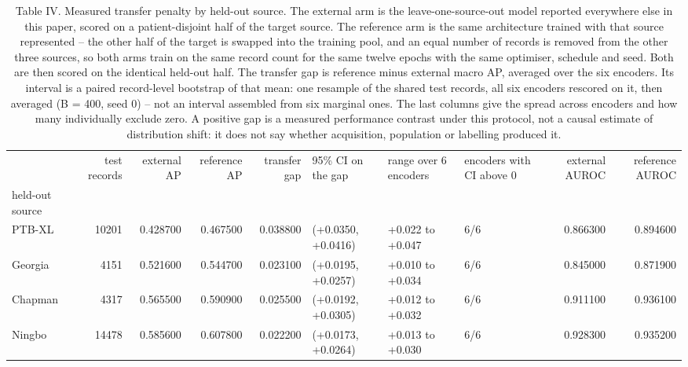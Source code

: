\begin{table}
\caption{Table IV. Measured transfer penalty by held-out source. The external arm is the leave-one-source-out model reported everywhere else in this paper, scored on a patient-disjoint half of the target source. The reference arm is the same architecture trained with that source represented -- the other half of the target is swapped into the training pool, and an equal number of records is removed from the other three sources, so both arms train on the same record count for the same twelve epochs with the same optimiser, schedule and seed. Both are then scored on the identical held-out half. The transfer gap is reference minus external macro AP, averaged over the six encoders. Its interval is a paired record-level bootstrap of that mean: one resample of the shared test records, all six encoders rescored on it, then averaged (B = 400, seed 0) -- not an interval assembled from six marginal ones. The last columns give the spread across encoders and how many individually exclude zero. A positive gap is a measured performance contrast under this protocol, not a causal estimate of distribution shift: it does not say whether acquisition, population or labelling produced it.}
\begin{tabular}{lrrrrlllrr}
\toprule
 & test records & external AP & reference AP & transfer gap & 95\% CI on the gap & range over 6 encoders & encoders with CI above 0 & external AUROC & reference AUROC \\
held-out source &  &  &  &  &  &  &  &  &  \\
\midrule
PTB-XL & 10201 & 0.428700 & 0.467500 & 0.038800 & (+0.0350, +0.0416) & +0.022 to +0.047 & 6/6 & 0.866300 & 0.894600 \\
Georgia & 4151 & 0.521600 & 0.544700 & 0.023100 & (+0.0195, +0.0257) & +0.010 to +0.034 & 6/6 & 0.845000 & 0.871900 \\
Chapman & 4317 & 0.565500 & 0.590900 & 0.025500 & (+0.0192, +0.0305) & +0.012 to +0.032 & 6/6 & 0.911100 & 0.936100 \\
Ningbo & 14478 & 0.585600 & 0.607800 & 0.022200 & (+0.0173, +0.0264) & +0.013 to +0.030 & 6/6 & 0.928300 & 0.935200 \\
\bottomrule
\end{tabular}
\end{table}
